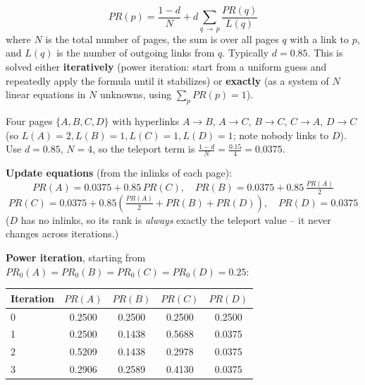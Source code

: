 \documentclass[11pt, a4paper]{article}
\begin{document}
\begin{formulabox}
\[
PR(p) = \frac{1-d}{N} + d \sum_{q \,\to\, p} \frac{PR(q)}{L(q)}
\]
where $N$ is the total number of pages, the sum is over all pages $q$ with a link to $p$, and $L(q)$ is the number of outgoing links from $q$. Typically $d=0.85$. This is solved either \textbf{iteratively} (power iteration: start from a uniform guess and repeatedly apply the formula until it stabilizes) or \textbf{exactly} (as a system of $N$ linear equations in $N$ unknowns, using $\sum_p PR(p)=1$).
\end{formulabox}

\begin{examplebox}
Four pages $\{A,B,C,D\}$ with hyperlinks $A\to B$, $A\to C$, $B\to C$, $C\to A$, $D\to C$ (so $L(A)=2, L(B)=1, L(C)=1, L(D)=1$; note nobody links to $D$). Use $d=0.85$, $N=4$, so the teleport term is $\frac{1-d}{N}=\frac{0.15}{4}=0.0375$.

\begin{center}
\end{center}

\textbf{Update equations} (from the inlinks of each page):
\[
PR(A)=0.0375+0.85\,PR(C), \quad PR(B)=0.0375+0.85\,\tfrac{PR(A)}{2}
\]
\[
PR(C)=0.0375+0.85\left(\tfrac{PR(A)}{2}+PR(B)+PR(D)\right), \quad PR(D)=0.0375
\]
($D$ has no inlinks, so its rank is \emph{always} exactly the teleport value -- it never changes across iterations.)

\textbf{Power iteration}, starting from $PR_0(A)=PR_0(B)=PR_0(C)=PR_0(D)=0.25$:

\begin{center}
\begin{tabular}{@{}lcccc@{}}
\toprule
Iteration & $PR(A)$ & $PR(B)$ & $PR(C)$ & $PR(D)$ \\
\midrule
0 & 0.2500 & 0.2500 & 0.2500 & 0.2500 \\
1 & 0.2500 & 0.1438 & 0.5688 & 0.0375 \\
2 & 0.5209 & 0.1438 & 0.2978 & 0.0375 \\
3 & 0.2906 & 0.2589 & 0.4130 & 0.0375 \\
\bottomrule
\end{tabular}
\end{center}


\end{examplebox}
\end{document}
